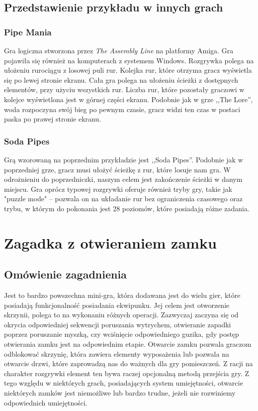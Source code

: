 \documentclass[oneside,polski,logo]{amuthesis}
\begin{document}
\subsection{Przedstawienie przykładu w innych grach}
\subsubsection{Pipe Mania}
\par Gra logiczna stworzona przez \emph{The Assembly Line} na platformy Amiga. Gra pojawiła się również na komputerach z systemem Windows. Rozgrywka polega na ułożeniu rurociągu z losowej puli rur. Kolejka rur, które otrzyma gracz wyświetla się po lewej stronie ekranu. Cała gra polega na ułożeniu ścieżki z dostępnych elementów, przy użyciu wszystkich rur. Liczba rur, które pozostały graczowi w kolejce wyświetlona jest w górnej części ekranu. Podobnie jak w grze ,,The Lore'', woda rozpoczyna swój bieg po pewnym czasie, gracz widzi ten czas w postaci paska po prawej stronie ekranu. \cite{pipemania}

\subsubsection{Soda Pipes}
\par Grą wzorowaną na poprzednim przykładzie jest ,,Soda Pipes''. Podobnie jak w poprzedniej grze, gracz musi ułożyć ścieżkę z rur, które losuje nam gra. W odrożnieniu do poprzedniczki, naszym celem jest zakończenie ścieżki w danym miejscu. Gra oprócz typowej rozgrywki oferuje również tryby gry, takie jak "puzzle mode" – pozwala on na układanie rur bez ograniczenia czasowego oraz trybu, w którym do pokonania jest 28 poziomów, które posiadają różne zadania. \cite{sp}
\section{Zagadka z otwieraniem zamku}
\subsection{Omówienie zagadnienia}
\par Jest to bardzo powszechna mini-gra, która dodawana jest do wielu gier, które posiadają funkcjonalność posiadania ekwipunku. Jej celem jest otworzenie skrzynii, polega to na wykonaniu różnych operacji. Zazwyczaj zaczyna się od okrycia odpowiedniej sekwencji poruszania wytrychem, otwieranie zapadki poprzez poruszanie myszką, czy wciśnięcie odpowiedniego guzika, gdy postęp otwierania zamku jest na odpowiednim etapie. Otwarcie zamku pozwala graczom odblokować skrzynię, która zawiera elementy wyposażenia lub pozwala na otwarcie drzwi, które zaprowadzą nas do ważnych dla gry pomieszczeń. Z racji na charakter rozgrywki element ten bywa raczej opcjonalną metodą przejścia gry. Z tego względu w niektórych grach, posiadających system umiejętności, otwarcie niektórych zamków jest niemożliwe lub bardzo trudne, jeżeli nie rozwiniemy odpowiednich umiejętności.
\end{document}
